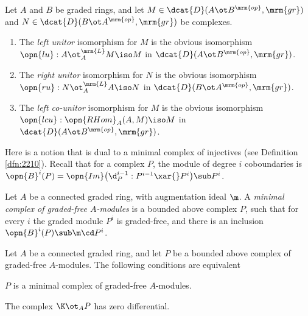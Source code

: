 \begin{dfn} \label{dfn:4530}
Let $A$ and $B$ be graded rings, and let 
$M \in \dcat{D}(A \ot B^{\mrm{op}}, \mrm{gr})$ and 
$N \in \dcat{D}(B \ot A^{\mrm{op}}, \mrm{gr})$ be complexes. 
\begin{enumerate}
\item The {\em left unitor}%
% 
isomorphism for $M$ is the obvious isomorphism 
$\opn{lu} : A \ot_A^{\mrm{L}} M \iso M$
in $\dcat{D}(A \ot B^{\mrm{op}}, \mrm{gr})$. 

\item The {\em right unitor}%
%
isomorphism for $N$ is the obvious isomorphism 
$\opn{ru} : N \ot_A^{\mrm{L}} A \iso N$
in $\dcat{D}(B \ot A^{\mrm{op}}, \mrm{gr})$. 

\item The {\em left co-unitor}%
%
isomorphism for $M$ is the obvious isomorphism  
$\opn{lcu} : \opn{RHom}_{A}(A, M) \iso M$
in $\dcat{D}(A \ot B^{\mrm{op}}, \mrm{gr})$.
\end{enumerate}
\end{dfn}

Here is a notion that is dual to a minimal complex of injectives
(see Definition \ref{dfn:2210}).  
Recall that for a complex $P$, the module of degree $i$ coboundaries is 
$\opn{B}^i(P) = \opn{Im} \bigl( \d_P^{i - 1} : P^{i - 1} \xar{} P^i \bigr)
\sub P^i$.

\begin{dfn} \label{dfn:4531}
Let $A$ be a connected graded ring, with augmentation ideal $\m$. 
A {\em minimal complex of graded-free $A$-modules}%
is a bounded above complex $P$, such that for every $i$ the graded module $P^i$ 
is graded-free, and there is an inclusion 
$\opn{B}^i(P) \sub \m \cd P^i$.
\end{dfn}

\begin{prop} \label{prop:4530}
Let $A$ be a connected graded ring, and let $P$ be a bounded above complex
of graded-free $A$-modules.
The following conditions are equivalent\tup{:}
\begin{itemize}
 $P$ is a minimal complex of graded-free $A$-modules.

 The complex $\K \ot_A P$ has zero differential.
\end{itemize}
\end{prop}

